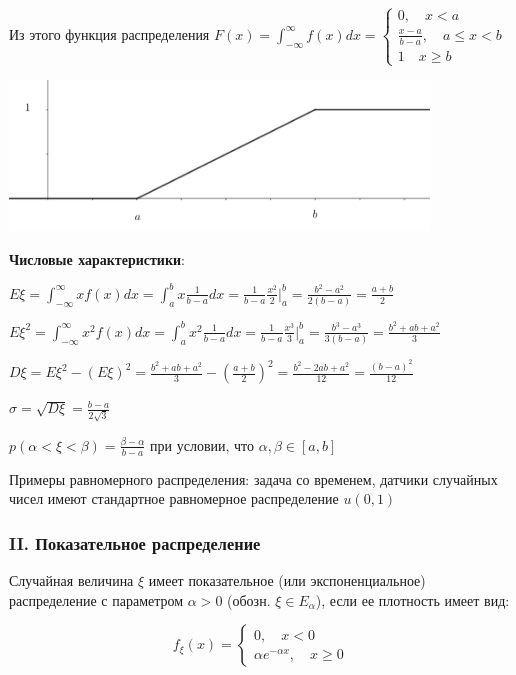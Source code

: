 \documentclass[12pt]{article}
\begin{document}
    Из этого функция распределения $F(x) = \int_{-\infty}^\infty f(x)dx = \begin{cases}0, \quad x < a \\ \frac{x - a}{b - a}, \quad a \leq x < b \\ 1 \quad x \geq b\end{cases}$

    \includegraphics[height=4cm]{probtheory/images/probtheory_2024_10_29_2}

    \textbf{Числовые характеристики}:

    $E\xi = \int_{-\infty}^\infty x f(x) dx = \int_a^b x \frac{1}{b - a} dx = \frac{1}{b - a} \frac{x^2}{2} \Big|_a^b = \frac{b^2 - a^2}{2(b - a)} = \frac{a + b}{2}$

    $E\xi^2 = \int_{-\infty}^\infty x^2 f(x) dx = \int_a^b x^2 \frac{1}{b - a} dx = \frac{1}{b - a} \frac{x^3}{3} \Big|_a^b = \frac{b^3 - a^3}{3(b - a)} = \frac{b^2 + ab + a^2}{3}$

    $D\xi = E\xi^2 - (E\xi)^2 = \frac{b^2 + ab + a^2}{3} - \left(\frac{a + b}{2}\right)^2 = \frac{b^2 - 2ab + a^2}{12} = \frac{(b - a)^2}{12}$
    
    $\sigma = \sqrt{D\xi} = \frac{b - a}{2\sqrt{3}}$

    $p(\alpha < \xi < \beta) = \frac{\beta - \alpha}{b - a}$ при условии, что $\alpha, \beta \in [a, b]$

    \Nota Примеры равномерного распределения: задача со временем, датчики случайных чисел имеют стандартное равномерное распределение $u(0, 1)$

    \subsubsection{II. Показательное распределение}

    \Defs Случайная величина $\xi$ имеет показательное (или экспоненциальное) распределение с параметром $\alpha > 0$ (обозн. $\xi \in E_\alpha$),
    если ее плотность имеет вид:

    \[f_\xi(x) = \begin{cases}0, \quad x < 0 \\ \alpha e^{-\alpha x}, \quad x \geq 0\end{cases}\]
\end{document}
